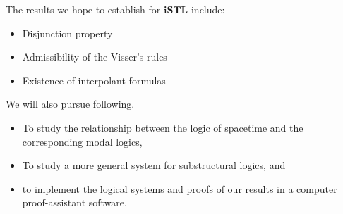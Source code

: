 \documentclass{beamer}
\begin{document}
\begin{frame}{\subResults}
	The results we hope to establish for $\mathbf{iSTL}$ include:
	\begin{itemize}
		\item Disjunction property
		\item Admissibility of the Visser's rules
		\item Existence of interpolant formulas
	\end{itemize}
\end{frame}

\begin{frame}{\subFurther}
	We will also pursue following.
\begin{itemize}
  \item To study the relationship between the logic of spacetime and the corresponding modal logics,
  \item To study a more general system for substructural logics, and
  \item to implement the logical systems and proofs of our results in a computer proof-assistant software.
\end{itemize}
\end{frame}



\end{document}
